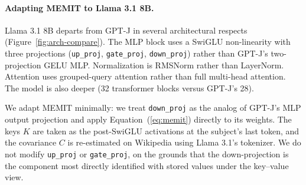 \paragraph{Adapting MEMIT to Llama 3.1 8B.}
Llama 3.1 8B departs from GPT-J in several architectural respects (Figure~\ref{fig:arch-compare}). The MLP block uses a SwiGLU non-linearity with three projections (\texttt{up\_proj}, \texttt{gate\_proj}, \texttt{down\_proj}) rather than GPT-J's two-projection GELU MLP. Normalization is RMSNorm rather than LayerNorm. Attention uses grouped-query attention rather than full multi-head attention. The model is also deeper (32 transformer blocks versus GPT-J's 28).

We adapt MEMIT minimally: we treat \texttt{down\_proj} as the analog of GPT-J's MLP output projection and apply Equation~(\ref{eq:memit}) directly to its weights. The keys $K$ are taken as the post-SwiGLU activations at the subject's last token, and the covariance $C$ is re-estimated on Wikipedia using Llama 3.1's tokenizer. We do not modify \texttt{up\_proj} or \texttt{gate\_proj}, on the grounds that the down-projection is the component most directly identified with stored values under the key--value view.

